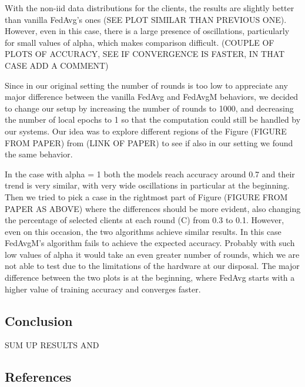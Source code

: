 \documentclass[twocolumn]{article}
\begin{document}
With the non-iid data distributions for the clients, the results are slightly better than vanilla FedAvg's ones (SEE PLOT SIMILAR THAN PREVIOUS ONE). However, even in this case, there is a large presence of oscillations, particularly for small values of alpha, which makes comparison difficult.
(COUPLE OF PLOTS OF ACCURACY, SEE IF CONVERGENCE IS FASTER, IN THAT CASE ADD A COMMENT)

Since in our original setting the number of rounds is too low to appreciate any major difference between the vanilla FedAvg and FedAvgM behaviors, we decided to change our setup by increasing the number of rounds to 1000, and decreasing the number of local epochs to 1 so that the computation could still be handled by our systems.
Our idea was to explore different regions of the Figure (FIGURE FROM PAPER) from (LINK OF PAPER) to see if also in our setting we found the same behavior.

In the case with alpha = 1 both the models reach accuracy around 0.7 and their trend is very similar, with very wide oscillations in particular at the beginning.
Then we tried to pick a case in the rightmost part of Figure (FIGURE FROM PAPER AS ABOVE) where the differences should be more evident, also changing the percentage of selected clients at each round (C) from 0.3 to 0.1. 
However, even on this occasion, the two algorithms achieve similar results. In this case FedAvgM's algorithm fails to achieve the expected accuracy. Probably with such low values of alpha it would take an even greater number of rounds, which we are not able to test due to the limitations of the hardware at our disposal. The major difference between the two plots is at the beginning, where FedAvg starts with a higher value of training accuracy and converges faster.



\subsection{Conclusion}
SUM UP RESULTS AND 
\subsection{References}
\end{document}

